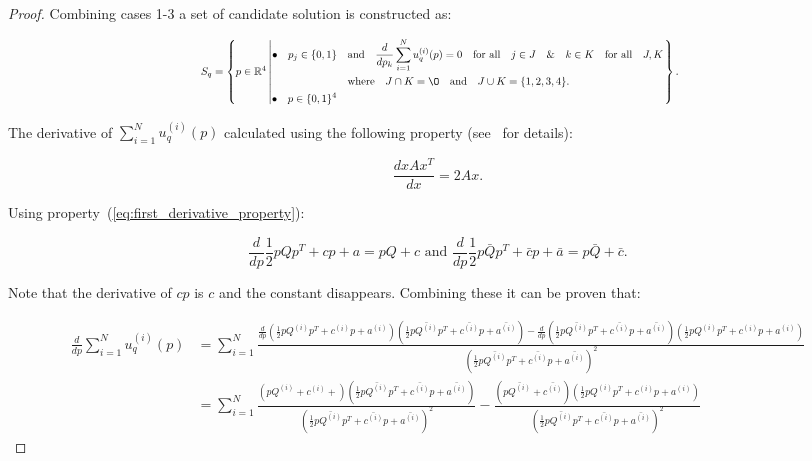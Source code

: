 \begin{proof}
Combining cases 1-3 a set of candidate solution is constructed as:

\begin{equation*}
    \resizebox{\linewidth}{!}{ $
    S_q =
    \left\{p \in \mathbb{R} ^ 4 \left|
        \begin{aligned}
            \bullet\quad p_j \in \{0, 1\} & \quad \text{and} \quad \frac{d}{dp_k} 
            \sum\limits_{i=1} ^ N  u_q^{(i)}(p) = 0
            \quad \text{for all} \quad j \in J \quad \&  \quad k \in K  \quad \text{for all} \quad J, K \\
            & \quad \text{where} \quad J \cap K = \O \quad
            \text{and} \quad J \cup K = \{1, 2, 3, 4\}.\\
            \bullet\quad  p \in \{0, 1\} ^ 4
        \end{aligned}\right.
    \right\}.
    $}
\end{equation*}

The derivative of \(\sum\limits_{i=1} ^ N  u_q^{(i)}(p)\) calculated using
the following property (see~\cite{Abadir2005} for details):

\begin{equation}\label{eq:first_derivative_property}
\frac{d x A x^T}{dx} =  2Ax.
\end{equation}

Using property~(\ref{eq:first_derivative_property}):

\begin{equation}\label{eq:quadratics_derivatives}
\frac{d}{dp} \frac{1}{2}pQp^T + cp + a = pQ + c \text{ and } \frac{d}{dp} \frac{1}{2}p\bar{Q}p^T + \bar{c}p + \bar{a} = p\bar{Q} + \bar{c}.
\end{equation}

Note that the derivative of \(cp\) is \(c\) and the constant disappears.
Combining these it can be proven that:

\begingroup
\tiny
\begin{align*}
\frac{d}{dp} \sum\limits_{i=1} ^ N  u_q^{(i)}(p) & = \sum\limits_{i=1} ^ N \frac{\frac{d}{dp}(\frac{1}{2}pQ^{(i)}p^T + c^{(i)}p + a^{(i)} )(\frac{1}{2}p\bar{Q^{(i)}}p^T + \bar{c^{(i)}}p + \bar{a^{(i)}}) -
\frac{d}{dp}(\frac{1}{2}p\bar{Q^{(i)}}p^T + \bar{c^{(i)}}p + \bar{a^{(i)}})(\frac{1}{2}pQ^{(i)}p^T + c^{(i)}p + a^{(i)})}{(\frac{1}{2}p\bar{Q^{(i)}}p^T + \bar{c^{(i)}}p + \bar{a^{(i)}})^2} \\
& = \sum\limits_{i=1} ^ N \frac{(pQ^{(i)} + c^{(i)} +)(\frac{1}{2}p\bar{Q^{(i)}}p^T + \bar{c^{(i)}}p + \bar{a^{(i)}})}{(\frac{1}{2}p\bar{Q^{(i)}}p^T + \bar{c^{(i)}}p + \bar{a^{(i)}})^2} -
 \frac{(p\bar{Q^{(i)}}+ \bar{c^{(i)}})(\frac{1}{2}pQ^{(i)}p^T + c^{(i)}p + a^{(i)})}{(\frac{1}{2}p\bar{Q^{(i)}}p^T + \bar{c^{(i)}}p + \bar{a^{(i)}})^2}
\end{align*}
\endgroup


\end{proof}
